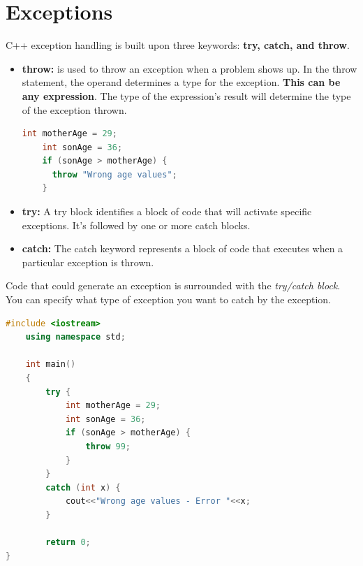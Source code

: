 \documentclass[12pt , a4paper]{article}
\begin{document}
\section{Exceptions}
C++ exception handling is built upon three keywords: \textbf{try, catch, and throw}.
	\begin{itemize}
		\item \textbf{throw:} is used to throw an exception when a problem shows up. In the throw statement, the operand determines a type for the exception. \textbf{This can be any expression}. The type of the expression's result will determine the type of the exception thrown.

	\begin{lstlisting}[language=C++]
	int motherAge = 29;
	int sonAge = 36;
	if (sonAge > motherAge) {
	  throw "Wrong age values";
	}		
	\end{lstlisting}

		\item \textbf{try:} A try block identifies a block of code that will activate specific exceptions. It's followed by one or more catch blocks.
		\item \textbf{catch:} The catch keyword represents a block of code that executes when a particular exception is thrown.
	\end{itemize} 
Code that could generate an exception is surrounded with the \emph{try/catch block}. You can specify what type of exception you want to catch by the exception.

	\begin{lstlisting}[language=C++]
	#include <iostream>
	using namespace std;
	
	int main()
	{
	    try {
	        int motherAge = 29;
	        int sonAge = 36;
	        if (sonAge > motherAge) {
	            throw 99;
	        }
	    }
	    catch (int x) {
	        cout<<"Wrong age values - Error "<<x;
	    }
	
	    return 0;
}		
	\end{lstlisting}
\end{document}
